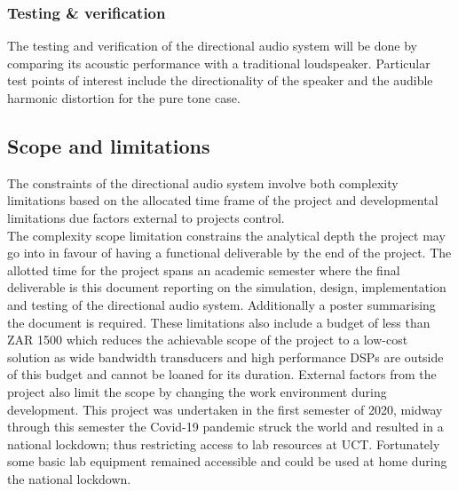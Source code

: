 \subsubsection{Testing \& verification}
The testing and verification of the directional audio system will be done by comparing its acoustic performance with a traditional loudspeaker. Particular test points of interest include the directionality of the speaker and the audible harmonic distortion for the pure tone case.

\subsection{Scope and limitations}
The constraints of the directional audio system involve both complexity limitations based on the allocated time frame of the project and developmental limitations due factors external to projects control.\\
The complexity scope limitation constrains the analytical depth the project may go into in favour of having a functional deliverable by the end of the project. The allotted time for the project spans an academic semester where the final deliverable is this document reporting on the simulation, design, implementation and testing of the directional audio system. Additionally a poster summarising the document is required.
These limitations also include a budget of less than ZAR 1500 which reduces the achievable scope of the project to a low-cost solution as wide bandwidth transducers and high performance DSPs are outside of this budget and cannot be loaned for its duration.
External factors from the project also limit the scope by changing the work environment during development. This project was undertaken in the first semester of 2020, midway through this semester the Covid-19 pandemic struck the world and resulted in a national lockdown; thus restricting access to lab resources at UCT. Fortunately some basic lab equipment remained accessible and could be used at home during the national lockdown.
\newpage
